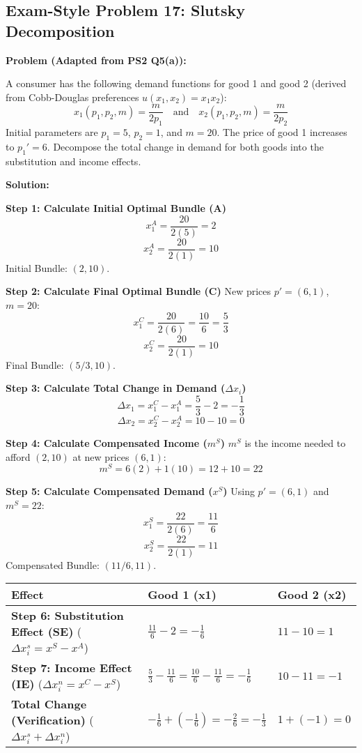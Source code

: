 \documentclass{article}
\begin{document}
\subsection*{Exam-Style Problem 17: Slutsky Decomposition}

\textbf{Problem (Adapted from PS2 Q5(a)):}

A consumer has the following demand functions for good 1 and good 2 (derived from Cobb-Douglas preferences $u(x_1, x_2) = x_1 x_2$): \[x_1(p_1, p_2, m) = \frac{m}{2p_1} \quad \text{and} \quad x_2(p_1, p_2, m) = \frac{m}{2p_2}\] Initial parameters are $p_1=5$, $p_2=1$, and $m=20$. The price of good 1 increases to $p_1'=6$. Decompose the total change in demand for both goods into the substitution and income effects.

\textbf{Solution:}

\textbf{Step 1: Calculate Initial Optimal Bundle (A)} \[ x_1^A = \frac{20}{2(5)} = 2 \] \[ x_2^A = \frac{20}{2(1)} = 10 \] Initial Bundle: $(2, 10)$.

\textbf{Step 2: Calculate Final Optimal Bundle (C)} New prices $p'=(6, 1)$, $m=20$: \[ x_1^C = \frac{20}{2(6)} = \frac{10}{6} = \frac{5}{3} \] \[ x_2^C = \frac{20}{2(1)} = 10 \] Final Bundle: $(5/3, 10)$.

\textbf{Step 3: Calculate Total Change in Demand ($\Delta x_i$)} \[ \Delta x_1 = x_1^C - x_1^A = \frac{5}{3} - 2 = -\frac{1}{3} \] \[ \Delta x_2 = x_2^C - x_2^A = 10 - 10 = 0 \]

\textbf{Step 4: Calculate Compensated Income ($m^S$)} $m^S$ is the income needed to afford $(2, 10)$ at new prices $(6, 1)$: \[ m^S = 6(2) + 1(10) = 12 + 10 = 22 \]

\textbf{Step 5: Calculate Compensated Demand ($x^S$)} Using $p'=(6, 1)$ and $m^S=22$: \[ x_1^S = \frac{22}{2(6)} = \frac{11}{6} \] \[ x_2^S = \frac{22}{2(1)} = 11 \] Compensated Bundle: $(11/6, 11)$.

\begin{center}
\begin{tabular}{p{7.5cm}ll}
\toprule
Effect& Good 1 (x1)& Good 2 (x2) \\
\midrule
\textbf{Step 6: Substitution Effect (SE)} ($\Delta x_i^s = x^S - x^A$)& $\frac{11}{6} - 2 = -\frac{1}{6}$& $11 - 10 = 1$ \\
\addlinespace
\textbf{Step 7: Income Effect (IE)} ($\Delta x_i^n = x^C - x^S$)& $\frac{5}{3} - \frac{11}{6} = \frac{10}{6} - \frac{11}{6} = -\frac{1}{6}$& $10 - 11 = -1$ \\
\addlinespace
\textbf{Total Change (Verification)} ($\Delta x_i^s + \Delta x_i^n$)& $-\frac{1}{6} + (-\frac{1}{6}) = -\frac{2}{6} = -\frac{1}{3}$& $1 + (-1) = 0$ \\
\bottomrule
\end{tabular}
\end{center}
\end{document}
